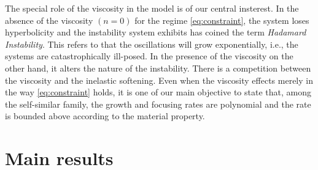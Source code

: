 \documentclass[graybox]{svmult}
\begin{document}
The special role of the viscosity in the model is of our central insterest. In the absence of the viscosity $(n=0)$ for the regime \eqref{eq:constraint}, the system loses hyperbolicity and the instability system exhibits has coined the term {\it Hadamard Instability}. This refers to that the oscillations will grow exponentially, i.e., the systems are catastrophically ill-posed. In the presence of the viscosity on the other hand, it alters the nature of the instability. There is a competition between the viscosity and the inelastic softening. Even when the viscosity effects merely in the way \eqref{eq:constraint} holds, it is one of our main objective to state that, among the self-similar family, the growth and focusing rates are polynomial and the rate is bounded above according to the material property.



\section{Main results}
\end{document}
